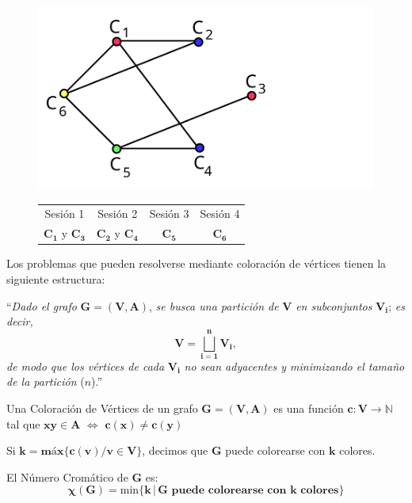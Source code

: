 \documentclass[twoside]{report}
\newcommand{\bs}[1]{\boldsymbol{#1}}
\begin{document}
           \begin{figure}[h!]\centering
           \includegraphics[scale=0.3]{pdfs/color6.pdf}
           \begin{tabular}{cccc}
                  Sesión 1 & Sesión 2 & Sesión 3 & Sesión 4 \\
                  $\bs{C_1}$ y $\bs{C_3}$ & $\bs{C_2}$ y $\bs{C_4}$ & $\bs{C_5}$ & $\bs{C_6}$
            \end{tabular}
           \end{figure}

Los problemas que pueden resolverse mediante coloración de vértices tienen la siguiente estructura:
\vspace{0.2cm}

``\emph{Dado el grafo} $\bs{G=(V,A)}$, \emph{se busca una partición de }$\bs{V}$ \emph{en subconjuntos }$\bs{V_i}$; \emph{es decir,}
$$\bs{V=\bigsqcup_{i=1}^{n}V_i},$$ \emph{de modo que los vértices de cada} $\bs{V_i}$ \emph{no sean adyacentes y minimizando el tamaño de la partición }($n$).''
\vspace{0.4cm}

\begin{defi}
Una Coloración de Vértices de un grafo $\bs{G=(V,A)}$ es una función $\bs{c:V\rightarrow\mathbb{N}}$ tal que
$\bs{xy\in A\,\,\Leftrightarrow\,\,c(x)\neq c(y)}$
\end{defi}

\begin{defi}
Si $\bs{k=\mbox{máx}\{c(v)/v\in V\}}$, decimos que  $\bs{G}$ puede colorearse con $\bs{k}$ colores.
\end{defi}

\begin{defi}
El Número Cromático de $\bs{G}$ es:
        $$\bs{\chi(G)=\mathrm{min}\{k\,|\,G \mbox{ puede colorearse con } k \mbox{ colores}\}}$$
\end{defi}
\end{document}
